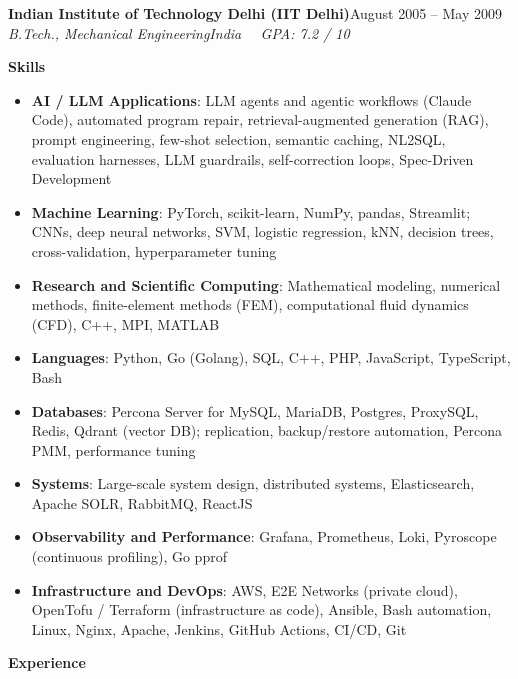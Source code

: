 \documentclass[a4paper,10pt]{article}
\newcommand{\resheading}[1]{%
  \par\vspace{10pt}%
  \noindent\colorbox{headbg}{\parbox{\dimexpr\linewidth-2\fboxsep\relax}{%
    \strut\color{accent}\large\bfseries #1}}\par%
  \vspace{5pt}%
}
\newcommand{\resrole}[4]{%
  {\color{accent}\bfseries #1}\hfill{\color{muted}#2}\\%
  {\itshape #3}\hfill{\color{muted}\itshape #4}\par\vspace{1pt}%
}
\begin{document}
\resrole{Indian Institute of Technology Delhi (IIT Delhi)}{August 2005 -- May 2009}{B.Tech., Mechanical Engineering}{India \ \textbar\ GPA: 7.2 / 10}

\resheading{Skills}

\begin{itemize}
  \item \textbf{AI / LLM Applications}: LLM agents and agentic workflows (Claude Code), automated program repair, retrieval-augmented generation (RAG), prompt engineering, few-shot selection, semantic caching, NL2SQL, evaluation harnesses, LLM guardrails, self-correction loops, Spec-Driven Development
  \item \textbf{Machine Learning}: PyTorch, scikit-learn, NumPy, pandas, Streamlit; CNNs, deep neural networks, SVM, logistic regression, kNN, decision trees, cross-validation, hyperparameter tuning
  \item \textbf{Research and Scientific Computing}: Mathematical modeling, numerical methods, finite-element methods (FEM), computational fluid dynamics (CFD), C++, MPI, MATLAB
  \item \textbf{Languages}: Python, Go (Golang), SQL, C++, PHP, JavaScript, TypeScript, Bash
  \item \textbf{Databases}: Percona Server for MySQL, MariaDB, Postgres, ProxySQL, Redis, Qdrant (vector DB); replication, backup/restore automation, Percona PMM, performance tuning
  \item \textbf{Systems}: Large-scale system design, distributed systems, Elasticsearch, Apache SOLR, RabbitMQ, ReactJS
  \item \textbf{Observability and Performance}: Grafana, Prometheus, Loki, Pyroscope (continuous profiling), Go pprof
  \item \textbf{Infrastructure and DevOps}: AWS, E2E Networks (private cloud), OpenTofu / Terraform (infrastructure as code), Ansible, Bash automation, Linux, Nginx, Apache, Jenkins, GitHub Actions, CI/CD, Git
\end{itemize}

\resheading{Experience}
\end{document}
